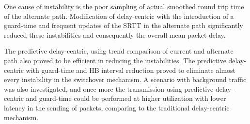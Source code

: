 \documentclass[letterpaper,10pt,oneside,conference,final]{sbrt2015}
\begin{document}
One cause of instability is the poor sampling of actual smoothed round trip time of the alternate path. Modification of delay-centric with the introduction of a guard-time and frequent updates of the SRTT in the alternate path significantly reduced these instabilities and consequently the overall mean packet delay.

The predictive delay-centric, using trend comparison of current and alternate path also proved to be efficient in reducing the instabilities. The predictive delay-centric with guard-time and HB interval reduction proved to eliminate almost every instability in the switchover mechanism. A scenario with background traffic was also investigated, and once more the  transmission using predictive delay-centric and guard-time could be performed at higher utilization with lower latency in the sending of packets, comparing to the traditional delay-centric mechanism.





\end{document}
